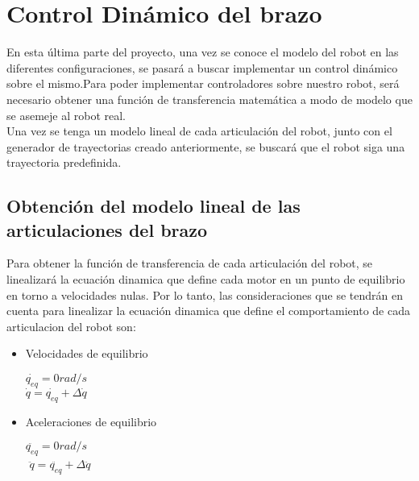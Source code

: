 \section{Control Dinámico del brazo}
En esta última parte del proyecto, una vez se conoce el modelo del robot en las diferentes configuraciones, se pasará a buscar implementar un control dinámico sobre el mismo.Para poder implementar controladores sobre nuestro robot, será necesario obtener una función de transferencia matemática a modo de modelo que se asemeje al robot real.\\
Una vez se tenga un modelo lineal de cada articulación del robot, junto con el generador de trayectorias creado anteriormente, se buscará que el robot siga una trayectoria predefinida.\\

	\subsection{Obtención del modelo lineal de las articulaciones del brazo}
Para obtener la función de transferencia de cada articulación del robot, se linealizará la ecuación dinamica que define cada motor en un punto de equilibrio en torno a velocidades nulas. Por lo tanto, las consideraciones que se tendrán en cuenta para linealizar la ecuación dinamica que define el comportamiento de cada articulacion del robot son:
\begin{itemize}
	\item Velocidades de equilibrio
	\begin{center}
		$ \dot{q_{eq}}=0 rad/s $\\
		$ \dot{q} =\dot{q_{eq}}+\Delta\dot{q}$
	\end{center}
	\item Aceleraciones de equilibrio
\begin{center}
	$ \ddot{q_{eq}}=0 rad/s $\\
	$  $
	$ \ddot{q} =\ddot{q_{eq}}+\Delta\ddot{q}$
\end{center}
\end{itemize}

